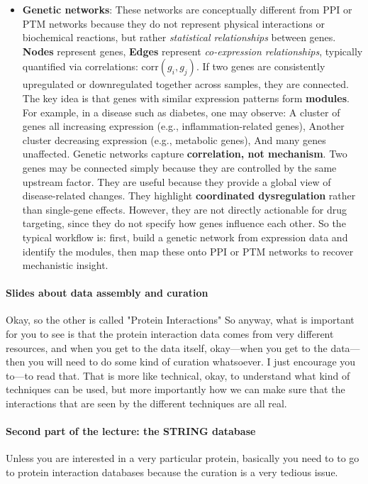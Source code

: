 \begin{itemize}
\item \textbf{Genetic networks}: These networks are conceptually different from PPI or PTM networks because they do not represent physical interactions or biochemical reactions, but rather \emph{statistical relationships} between genes.
\textbf{Nodes} represent genes, \textbf{Edges} represent \emph{co-expression relationships}, typically quantified via correlations: $\mathrm{corr}(g_i, g_j)$. If two genes are consistently upregulated or downregulated together across samples, they are connected.
The key idea is that genes with similar expression patterns form \textbf{modules}.  For example, in a disease such as diabetes, one may observe:
A cluster of genes all increasing expression (e.g., inflammation-related genes), Another cluster decreasing expression (e.g., metabolic genes),  And many genes unaffected.
Genetic networks capture \textbf{correlation, not mechanism}. Two genes may be connected simply because they are controlled by the same upstream factor.
They are useful because they provide a global view of disease-related changes. They highlight \textbf{coordinated dysregulation} rather than single-gene effects.
However, they are not directly actionable for drug targeting, since they do not specify how genes influence each other.
So the typical workflow is: first, build a genetic network from expression data and identify the modules, then map these onto PPI or PTM networks to recover mechanistic insight.
\end{itemize}
\paragraph{Slides about data assembly and curation} Okay, so the other is called "Protein Interactions" So anyway, what is important for you to see is that the protein interaction data comes from very different resources, and when you get to the data itself, okay—when you get to the data—then you will need to do some kind of curation whatsoever. I just encourage you to—to read that. That is more like technical, okay, to understand what kind of techniques can be used, but more importantly how we can make sure that the interactions that are seen by the different techniques are all real.

\paragraph{Second part of the lecture: the STRING database}
Unless you are interested in a very particular protein, basically you need to to go to protein interaction databases because the curation is a very tedious issue.

